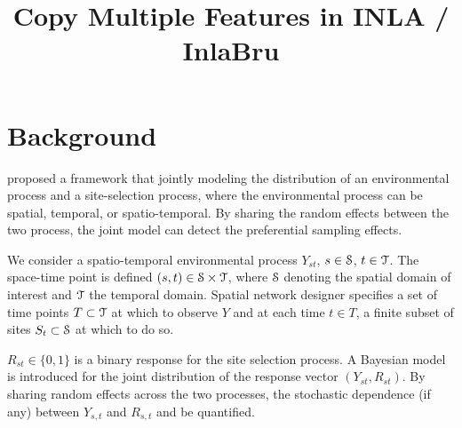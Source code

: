 \documentclass{article}
\title{Copy Multiple Features in INLA / InlaBru}
\begin{document}
\maketitle

\section{Background}
\cite{Watson2019_pref_samp} proposed a framework that jointly modeling the distribution of an
environmental process and a site-selection process, where the environmental process can be spatial,
temporal, or spatio-temporal. By sharing the random effects between the two process, the joint
model can detect the preferential sampling effects.

We consider a spatio-temporal environmental process $Y_{st}$, $s\in \mathcal{S}$, $t\in \mathcal{T}$.
The space-time point is defined $(s, t) \in \mathcal{S} \times \mathcal{T}$, where $\mathcal{S}$ denoting the spatial 
domain of interest and $\mathcal{T}$ the temporal domain. 
Spatial network designer specifies a set of time points $T \subset \mathcal{T}$ at which to observe
$Y$ and at each time $t \in T$, a finite subset of sites $S_t \subset \mathcal{S}$ at which to do so.

$R_{st} \in \{0, 1\}$ is a binary response for the site selection process.
A Bayesian model is introduced for the joint distribution of the response vector $(Y_{st}, R_{st})$.
By sharing random effects across the two processes, the stochastic dependence (if any) between 
$Y_{s, t}$ and $R_{s, t}$ and be quantified.
\end{document}
